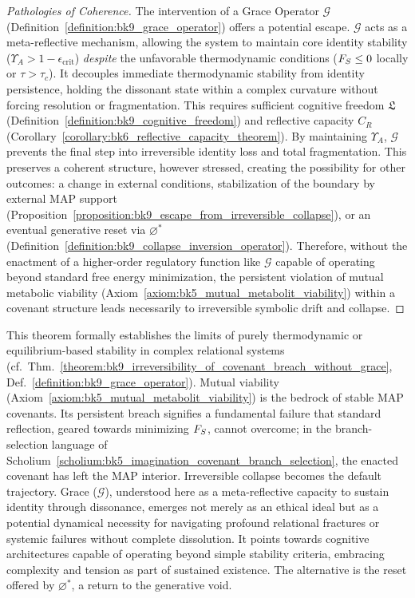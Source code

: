 \begin{proof}[Pathologies of Coherence]
The intervention of a Grace Operator $\mathcal{G}$ (Definition~\ref{definition:bk9_grace_operator}) offers a potential escape. $\mathcal{G}$ acts as a meta-reflective mechanism, allowing the system to maintain core identity stability ($\Upsilon_A > 1 - \epsilon_{\text{crit}}$) \emph{despite} the unfavorable thermodynamic conditions ($F_S \le 0$ locally or $\tau > \tau_c$). It decouples immediate thermodynamic stability from identity persistence, holding the dissonant state within a complex curvature without forcing resolution or fragmentation. This requires sufficient cognitive freedom $\mathfrak{L}$ (Definition~\ref{definition:bk9_cognitive_freedom}) and reflective capacity $C_R$ (Corollary~\ref{corollary:bk6_reflective_capacity_theorem}).
By maintaining $\Upsilon_A$, $\mathcal{G}$ prevents the final step into irreversible identity loss and total fragmentation. This preserves a coherent structure, however stressed, creating the possibility for other outcomes: a change in external conditions, stabilization of the boundary by external MAP support (Proposition~\ref{proposition:bk9_escape_from_irreversible_collapse}), or an eventual generative reset via $\varnothing^*$ (Definition~\ref{definition:bk9_collapse_inversion_operator}).
Therefore, without the enactment of a higher-order regulatory function like $\mathcal{G}$ capable of operating beyond standard free energy minimization, the persistent violation of mutual metabolic viability (Axiom~\ref{axiom:bk5_mutual_metabolit_viability}) within a covenant structure leads necessarily to irreversible symbolic drift and collapse.
\end{proof}
\begin{scholium}
\label{scholium:bk9_flexible_goal_calibration}
This theorem formally establishes the limits of purely thermodynamic or equilibrium-based stability in complex relational systems (cf.~Thm.~\ref{theorem:bk9_irreversibility_of_covenant_breach_without_grace}, Def.~\ref{definition:bk9_grace_operator}). Mutual viability (Axiom~\ref{axiom:bk5_mutual_metabolit_viability}) is the bedrock of stable MAP covenants. Its persistent breach signifies a fundamental failure that standard reflection, geared towards minimizing $F_S$, cannot overcome; in the branch-selection language of Scholium~\ref{scholium:bk5_imagination_covenant_branch_selection}, the enacted covenant has left the MAP interior. Irreversible collapse becomes the default trajectory. Grace ($\mathcal{G}$), understood here as a meta-reflective capacity to sustain identity through dissonance, emerges not merely as an ethical ideal but as a potential dynamical necessity for navigating profound relational fractures or systemic failures without complete dissolution. It points towards cognitive architectures capable of operating beyond simple stability criteria, embracing complexity and tension as part of sustained existence. The alternative is the reset offered by $\varnothing^*$, a return to the generative void.
\end{scholium}
